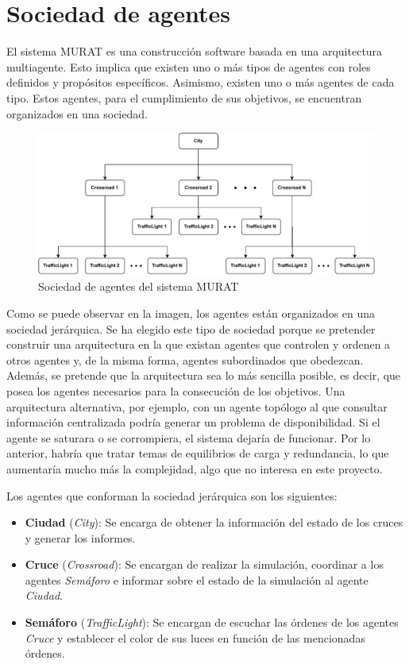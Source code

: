 \section{Sociedad de agentes}
    \label{section:sociedad_de_agentes}
El sistema MURAT es una construcción software basada en una arquitectura multiagente. Esto implica que existen uno o más tipos de agentes con roles definidos y propósitos específicos. Asimismo, existen uno o más agentes de cada tipo. Estos agentes, para el cumplimiento de sus objetivos, se encuentran organizados en una sociedad.
\begin{figure}[H]
    \centering
    \includegraphics[width=1\linewidth]{text/image/DAgen-Sociedad_de_agentes.pdf}
    \caption{Sociedad de agentes del sistema MURAT}
    \label{fig:sociedad_de_agentes}
\end{figure}
Como se puede observar en la imagen, los agentes están organizados en una sociedad jerárquica. Se ha elegido este tipo de sociedad porque se pretender construir una arquitectura en la que existan agentes que controlen y ordenen a otros agentes y, de la misma forma, agentes subordinados que obedezcan. Además, se pretende que la arquitectura sea lo más sencilla posible, es decir, que posea los agentes necesarios para la consecución de los objetivos. Una arquitectura alternativa, por ejemplo, con un agente topólogo al que consultar información centralizada podría generar un problema de disponibilidad. Si el agente se saturara o se corrompiera, el sistema dejaría de funcionar. Por lo anterior, habría que tratar temas de equilibrios de carga y redundancia, lo que aumentaría mucho más la complejidad, algo que no interesa en este proyecto.

Los agentes que conforman la sociedad jerárquica son los siguientes:
\begin{itemize}
    \item \textbf{Ciudad} (\textit{City}): Se encarga de obtener la información del estado de los cruces y generar los informes.
    \item \textbf{Cruce} (\textit{Crossroad}): Se encargan de realizar la simulación, coordinar a los agentes \textit{Semáforo} e informar sobre el estado de la simulación al agente \textit{Ciudad}.
    \item \textbf{Semáforo} (\textit{TrafficLight}): Se encargan de escuchar las órdenes de los agentes \textit{Cruce} y establecer el color de sus luces en función de las mencionadas órdenes.
\end{itemize}

